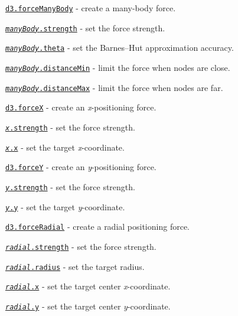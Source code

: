 \begin{DoxyItemize}
\item \href{https://github.com/d3/d3-force/blob/master/README.md#forceManyBody}{\tt d3.\+force\+Many\+Body} -\/ create a many-\/body force.
\item \href{https://github.com/d3/d3-force/blob/master/README.md#manyBody_strength}{\tt {\itshape many\+Body}.strength} -\/ set the force strength.
\item \href{https://github.com/d3/d3-force/blob/master/README.md#manyBody_theta}{\tt {\itshape many\+Body}.theta} -\/ set the Barnes–\+Hut approximation accuracy.
\item \href{https://github.com/d3/d3-force/blob/master/README.md#manyBody_distanceMin}{\tt {\itshape many\+Body}.distance\+Min} -\/ limit the force when nodes are close.
\item \href{https://github.com/d3/d3-force/blob/master/README.md#manyBody_distanceMax}{\tt {\itshape many\+Body}.distance\+Max} -\/ limit the force when nodes are far.
\item \href{https://github.com/d3/d3-force/blob/master/README.md#forceX}{\tt d3.\+forceX} -\/ create an {\itshape x}-\/positioning force.
\item \href{https://github.com/d3/d3-force/blob/master/README.md#x_strength}{\tt {\itshape x}.strength} -\/ set the force strength.
\item \href{https://github.com/d3/d3-force/blob/master/README.md#x_x}{\tt {\itshape x}.x} -\/ set the target {\itshape x}-\/coordinate.
\item \href{https://github.com/d3/d3-force/blob/master/README.md#forceY}{\tt d3.\+forceY} -\/ create an {\itshape y}-\/positioning force.
\item \href{https://github.com/d3/d3-force/blob/master/README.md#y_strength}{\tt {\itshape y}.strength} -\/ set the force strength.
\item \href{https://github.com/d3/d3-force/blob/master/README.md#y_y}{\tt {\itshape y}.y} -\/ set the target {\itshape y}-\/coordinate.
\item \href{https://github.com/d3/d3-force/blob/master/README.md#forceRadial}{\tt d3.\+force\+Radial} -\/ create a radial positioning force.
\item \href{https://github.com/d3/d3-force/blob/master/README.md#radial_strength}{\tt {\itshape radial}.strength} -\/ set the force strength.
\item \href{https://github.com/d3/d3-force/blob/master/README.md#radial_radius}{\tt {\itshape radial}.radius} -\/ set the target radius.
\item \href{https://github.com/d3/d3-force/blob/master/README.md#radial_x}{\tt {\itshape radial}.x} -\/ set the target center {\itshape x}-\/coordinate.
\item \href{https://github.com/d3/d3-force/blob/master/README.md#radial_y}{\tt {\itshape radial}.y} -\/ set the target center {\itshape y}-\/coordinate.
\end{DoxyItemize}

